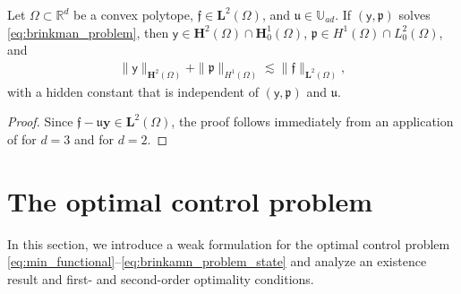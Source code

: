 \documentclass[final]{siamart0216}
\begin{document}
\begin{theorem}[regularity]
\label{eq:theorem_regularity}
Let $\Omega\subset \mathbb{R}^d$ be a convex polytope, $\boldsymbol{\mathfrak{f}}\in\mathbf{L}^2(\Omega)$, and $\mathfrak{u}\in \mathbb{U}_{ad}$. If $(\boldsymbol{\mathsf{y}},\mathfrak{p})$ solves \eqref{eq:brinkman_problem}, then $\boldsymbol{\mathsf{y}}\in\mathbf{H}^2(\Omega)\cap\mathbf{H}_0^1(\Omega)$, $\mathfrak{p}\in H^1(\Omega)\cap L_0^2(\Omega)$, and
\begin{align}\label{eq:regularity}
\|\boldsymbol{\mathsf{y}}\|_{\mathbf{H}^2(\Omega)}+\|\mathfrak{p}\|_{H^1(\Omega)}\lesssim \|\boldsymbol{\mathfrak{f}}\|_{\mathbf{L}^2(\Omega)},
\end{align}
with a hidden constant that is independent of $(\boldsymbol{\mathsf{y}},\mathfrak{p})$ and $\mathfrak{u}$.
\end{theorem}
\begin{proof}
	Since $\boldsymbol{\mathfrak{f}}-\mathfrak{u}\mathbf{y}\in \mathbf{L}^2(\Omega)$, the proof follows immediately from an application of \cite{MR0977489,MR1301452} for $d=3$ and \cite[Theorem 2]{MR0404849} for $d=2$.
\end{proof}

\section{The optimal control problem}
In this section, we introduce a weak formulation for
the optimal control problem \eqref{eq:min_functional}--\eqref{eq:brinkamn_problem_state} and analyze an existence result and first- and second-order optimality conditions.
\end{document}
